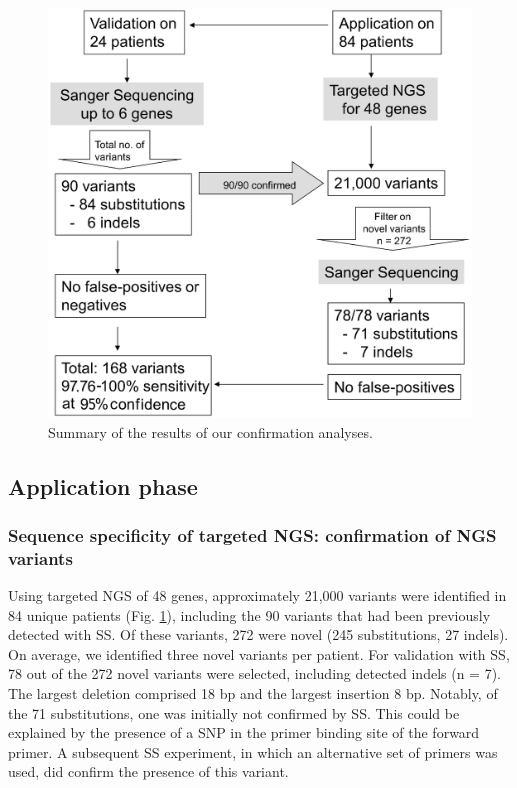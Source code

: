 \begin{figure}[!ht]
	\includegraphics[width=1.0\linewidth]{img/SNP_Indel_Fig3}
	\caption[Summary of the results of our confirmation analyses]{Summary of the results of our confirmation analyses.}
\label{fig:SNP_Indel_Fig3}
\end{figure}

\subsection{Application phase}

\subsubsection{Sequence specificity of targeted NGS: confirmation of NGS variants}
Using targeted NGS of 48 genes, approximately 21,000 variants were identified in 84 unique patients (Fig. \ref{fig:SNP_Indel_Fig3}), including the 90 variants that had been previously detected with SS. 
Of these variants, 272 were novel (245 substitutions, 27 indels). 
On average, we identified three novel variants per patient. 
For validation with SS, 78 out of the 272 novel variants were selected, including detected indels (n = 7). 
The largest deletion comprised 18 bp and the largest insertion 8 bp. 
Notably, of the 71 substitutions, one was initially not confirmed by SS. 
This could be explained by the presence of a SNP in the primer binding site of the forward primer. 
A subsequent SS experiment, in which an alternative set of primers was used, did confirm the presence of this variant. 

